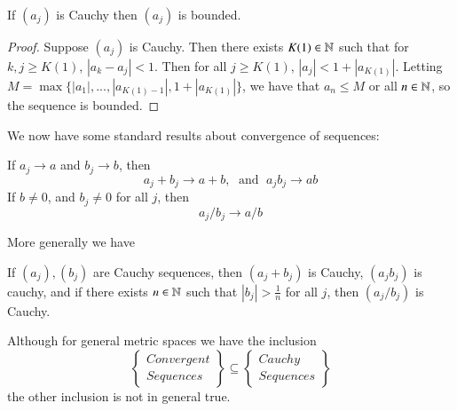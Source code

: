 \begin{proposition}
    If $(a_j)$ is Cauchy then $(a_j)$ is bounded.
\end{proposition}
\begin{proof}
    Suppose $(a_j)$ is Cauchy. Then there exists $K(1) \in \mathbb N$ such that for $k,j\geq K(1)$, $|a_k - a_j| < 1$. Then for all $j \geq K(1)$, $|a_j| < 1 + |a_{K(1)}|$. Letting $M = \max\{|a_1|,...,|a_{K(1)-1}|, 1+|a_{K(1)}|\}$, we have that $a_n \leq M$ or all $n \in \mathbb N$, so the sequence is bounded.
\end{proof}

We now have some standard results about convergence of sequences:

\begin{proposition}\label{prop:1.5.1}
    If $a_j\rightarrow a$ and $b_j\rightarrow b$, then $$a_j+b_j\rightarrow a+b,\;\text{ and }\;a_jb_j\rightarrow ab$$ If $b \neq 0$, and $b_j \neq 0$ for all $j$, then $$a_j/b_j\rightarrow a/b$$
\end{proposition}

More generally we have 
\begin{definition}
    If $(a_j),(b_j)$ are Cauchy sequences, then $(a_j+b_j)$ is Cauchy, $(a_jb_j)$ is cauchy, and if there exists $n \in \mathbb N$ such that $|b_j| > \frac{1}{n}$ for all $j$, then $(a_j/b_j)$ is Cauchy.
\end{definition}

Although for general metric spaces we have the inclusion $$\left\{\begin{array}{cc} Convergent \\ Sequences\end{array}\right\} \subseteq \left\{\begin{array}{cc} Cauchy \\ Sequences \end{array}\right\}$$
the other inclusion is not in general true.

